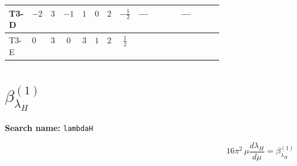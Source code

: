 \documentclass[8pt]{article}
\begin{document}
\begin{landscape}
\begin{longtable}{@{}llcccccc >{\raggedright\arraybackslash}p{0.21\linewidth} >{\raggedright\arraybackslash}p{0.21\linewidth}@{}}
\midrule
T3-D & $-2$ & $3$ & $-1$ & $1$ & $0$ & $2$ & $-\frac{1}{2}$ & --- & --- \\
\midrule
T3-E & $0$ & $3$ & $0$ & $3$ & $1$ & $2$ & $\frac{1}{2}$ & \scriptsize\adjustbox{max width=\linewidth}{$\begin{gathered} +{m_{S_2}^2} (8 {\lambda_{S_2}}+4 {\lambda_{S_2}^{\rm Adj}})\end{gathered}$} & \scriptsize\adjustbox{max width=\linewidth}{$\begin{gathered} +{m_{S_1}^2} (6 {\lambda_{12}}+4 {\lambda_{12}^{\rm Cross}})\end{gathered}$} \\
\midrule
\bottomrule
\end{longtable}
\clearpage
\section*{$\beta_{\lambda_H}^{(1)}$}
\noindent\textbf{Search name: }\texttt{lambdaH}\par\smallskip
\[16\pi^2\,\mu\frac{d \lambda_H}{d\mu}=\beta_{\lambda_H}^{(1)}\]

\end{landscape}
\end{document}

